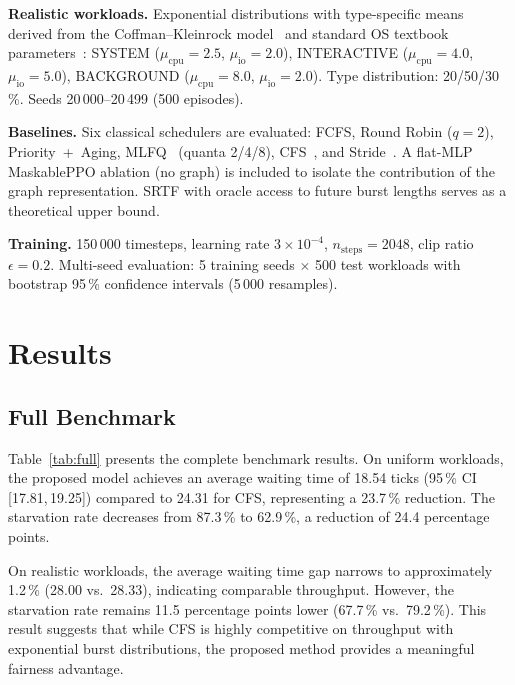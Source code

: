 \documentclass[conference]{IEEEtran}
\begin{document}
\textbf{Realistic workloads.}  Exponential distributions with
type-specific means derived from the Coffman--Kleinrock
model~\cite{coffman73} and standard OS textbook
parameters~\cite{silberschatz}: SYSTEM ($\mu_\text{cpu}{=}2.5$,
$\mu_\text{io}{=}2.0$), INTERACTIVE ($\mu_\text{cpu}{=}4.0$,
$\mu_\text{io}{=}5.0$), BACKGROUND ($\mu_\text{cpu}{=}8.0$,
$\mu_\text{io}{=}2.0$).  Type distribution: 20/50/30\,\%.  Seeds
20\,000--20\,499 (500 episodes).

\textbf{Baselines.}  Six classical schedulers are evaluated: FCFS, Round
Robin ($q{=}2$), Priority~+~Aging, MLFQ~\cite{ostep} (quanta 2/4/8),
CFS~\cite{cfs}, and Stride~\cite{stride}.  A flat-MLP MaskablePPO
ablation (no graph) is included to isolate the contribution of the graph
representation.  SRTF with oracle access to future burst lengths serves
as a theoretical upper bound.

\textbf{Training.}  150\,000 timesteps, learning rate
$3{\times}10^{-4}$, $n_\text{steps}{=}2048$, clip ratio
$\epsilon{=}0.2$.  Multi-seed evaluation: 5 training seeds $\times$ 500
test workloads with bootstrap 95\,\% confidence intervals (5\,000
resamples).

\section{Results}
\label{sec:results}

\subsection{Full Benchmark}

Table~\ref{tab:full} presents the complete benchmark results.  On
uniform workloads, the proposed model achieves an average waiting time of
18.54 ticks (95\,\% CI\,[17.81,\,19.25]) compared to 24.31 for CFS,
representing a 23.7\,\% reduction.  The starvation rate decreases from
87.3\,\% to 62.9\,\%, a reduction of 24.4 percentage points.

On realistic workloads, the average waiting time gap narrows to
approximately 1.2\,\% (28.00 vs.\ 28.33), indicating comparable
throughput.  However, the starvation rate remains 11.5 percentage points
lower (67.7\,\% vs.\ 79.2\,\%).  This result suggests that while CFS is
highly competitive on throughput with exponential burst distributions,
the proposed method provides a meaningful fairness advantage.
\end{document}
